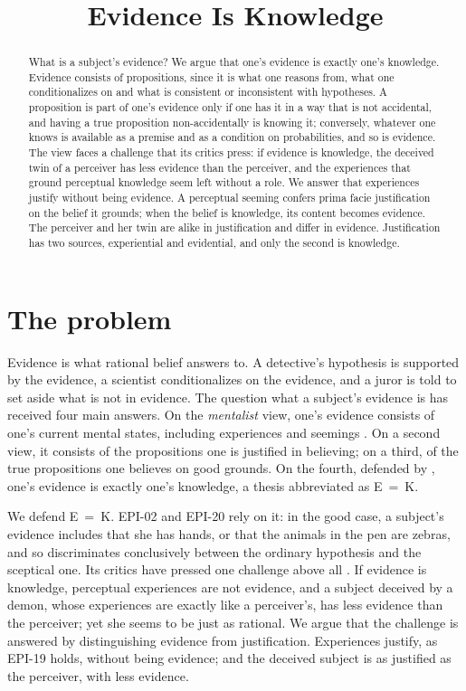 \documentclass{situationist-preprint}
\title{Evidence Is Knowledge}
\begin{document}
\maketitle

\begin{abstract}
What is a subject's evidence? We argue that one's evidence is exactly one's knowledge. Evidence consists of propositions, since it is what one reasons from, what one conditionalizes on and what is consistent or inconsistent with hypotheses. A proposition is part of one's evidence only if one has it in a way that is not accidental, and having a true proposition non-accidentally is knowing it; conversely, whatever one knows is available as a premise and as a condition on probabilities, and so is evidence. The view faces a challenge that its critics press: if evidence is knowledge, the deceived twin of a perceiver has less evidence than the perceiver, and the experiences that ground perceptual knowledge seem left without a role. We answer that experiences justify without being evidence. A perceptual seeming confers prima facie justification on the belief it grounds; when the belief is knowledge, its content becomes evidence. The perceiver and her twin are alike in justification and differ in evidence. Justification has two sources, experiential and evidential, and only the second is knowledge.
\end{abstract}

\section{The problem}

Evidence is what rational belief answers to. A detective's hypothesis is supported by the evidence, a scientist conditionalizes on the evidence, and a juror is told to set aside what is not in evidence. The question what a subject's evidence is has received four main answers. On the \emph{mentalist} view, one's evidence consists of one's current mental states, including experiences and seemings \citep{ConeeFeldman2004}. On a second view, it consists of the propositions one is justified in believing; on a third, of the true propositions one believes on good grounds. On the fourth, defended by \citet{Williamson1997,Williamson2000}, one's evidence is exactly one's knowledge, a thesis abbreviated as E~=~K.

We defend E~=~K. EPI-02 and EPI-20 rely on it: in the good case, a subject's evidence includes that she has hands, or that the animals in the pen are zebras, and so discriminates conclusively between the ordinary hypothesis and the sceptical one. Its critics have pressed one challenge above all \citep{Silins2005,Goldman2009,ComesanaKantin2010}. If evidence is knowledge, perceptual experiences are not evidence, and a subject deceived by a demon, whose experiences are exactly like a perceiver's, has less evidence than the perceiver; yet she seems to be just as rational. We argue that the challenge is answered by distinguishing evidence from justification. Experiences justify, as EPI-19 holds, without being evidence; and the deceived subject is as justified as the perceiver, with less evidence.
\end{document}
